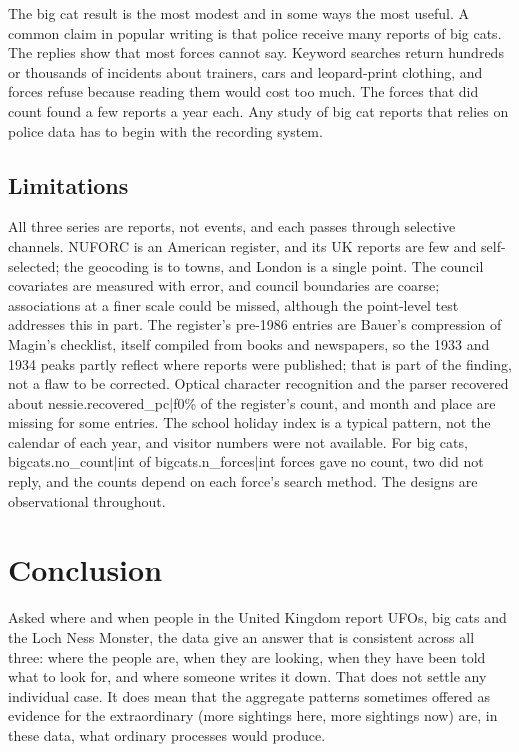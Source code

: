\documentclass[11pt,a4paper]{article}
\begin{document}
The big cat result is the most modest and in some ways the most useful. A common claim in popular writing is that police receive many reports of big cats. The replies show that most forces cannot say. Keyword searches return hundreds or thousands of incidents about trainers, cars and leopard-print clothing, and forces refuse because reading them would cost too much. The forces that did count found a few reports a year each. Any study of big cat reports that relies on police data has to begin with the recording system.

\subsection{Limitations}
All three series are reports, not events, and each passes through selective channels. NUFORC is an American register, and its UK reports are few and self-selected; the geocoding is to towns, and London is a single point. The council covariates are measured with error, and council boundaries are coarse; associations at a finer scale could be missed, although the point-level test addresses this in part. The register's pre-1986 entries are Bauer's compression of Magin's checklist, itself compiled from books and newspapers, so the 1933 and 1934 peaks partly reflect where reports were published; that is part of the finding, not a flaw to be corrected. Optical character recognition and the parser recovered about {{nessie.recovered_pc|f0}}\% of the register's count, and month and place are missing for some entries. The school holiday index is a typical pattern, not the calendar of each year, and visitor numbers were not available. For big cats, {{bigcats.no_count|int}} of {{bigcats.n_forces|int}} forces gave no count, two did not reply, and the counts depend on each force's search method. The designs are observational throughout.

\section{Conclusion}\label{sec:concl}
Asked where and when people in the United Kingdom report UFOs, big cats and the Loch Ness Monster, the data give an answer that is consistent across all three: where the people are, when they are looking, when they have been told what to look for, and where someone writes it down. That does not settle any individual case. It does mean that the aggregate patterns sometimes offered as evidence for the extraordinary (more sightings here, more sightings now) are, in these data, what ordinary processes would produce.
\end{document}
